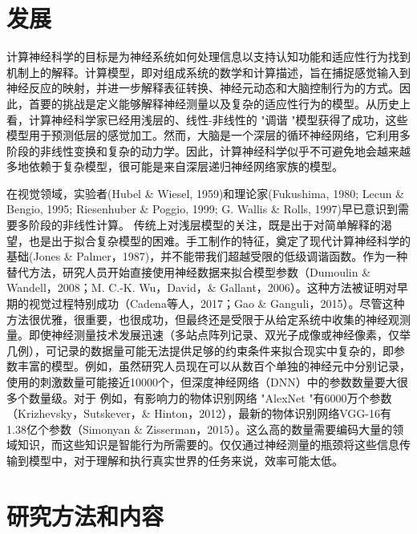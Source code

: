 \documentclass[UTF8,a4paper]{ctexart}
\begin{document}
\section{发展}
计算神经科学的目标是为神经系统如何处理信息以支持认知功能和适应性行为找到机制上的解释。计算模型，即对组成系统的数学和计算描述，旨在捕捉感觉输入到神经反应的映射，并进一步解释表征转换、神经元动态和大脑控制行为的方式。因此，首要的挑战是定义能够解释神经测量以及复杂的适应性行为的模型。从历史上看，计算神经科学家已经用浅层的、线性-非线性的 "调谐 "模型获得了成功，这些模型用于预测低层的感觉加工。然而，大脑是一个深层的循环神经网络，它利用多阶段的非线性变换和复杂的动力学。因此，计算神经科学似乎不可避免地会越来越多地依赖于复杂模型，很可能是来自深层递归神经网络家族的模型。
\par
在视觉领域，实验者(Hubel \& Wiesel, 1959)和理论家(Fukushima, 1980; Lecun \& Bengio, 1995; Riesenhuber \& Poggio, 1999; G. Wallis \& Rolls, 1997)早已意识到需要多阶段的非线性计算。
传统上对浅层模型的关注，既是出于对简单解释的渴望，也是出于拟合复杂模型的困难。手工制作的特征，奠定了现代计算神经科学的基础(Jones \& Palmer，1987)，并不能带我们超越受限的低级调谐函数。作为一种替代方法，研究人员开始直接使用神经数据来拟合模型参数（Dumoulin \& Wandell，2008；M. C.-K. Wu，David，\& Gallant，2006）。这种方法被证明对早期的视觉过程特别成功（Cadena等人，2017；Gao \& Ganguli，2015）。尽管这种方法很优雅，很重要，也很成功，但最终还是受限于从给定系统中收集的神经观测量。即使神经测量技术发展迅速（多站点阵列记录、双光子成像或神经像素，仅举几例），可记录的数据量可能无法提供足够的约束条件来拟合现实中复杂的，即参数丰富的模型。例如，虽然研究人员现在可以从数百个单独的神经元中分别记录，使用的刺激数量可能接近10000个，但深度神经网络（DNN）中的参数数量要大很多个数量级。对于
例如，有影响力的物体识别网络 "AlexNet "有6000万个参数（Krizhevsky，Sutskever，\& Hinton，2012），最新的物体识别网络VGG-16有1.38亿个参数（Simonyan \& Zisserman，2015）。这么高的数量需要编码大量的领域知识，而这些知识是智能行为所需要的。仅仅通过神经测量的瓶颈将这些信息传输到模型中，对于理解和执行真实世界的任务来说，效率可能太低。
\section{研究方法和内容}
\end{document}
